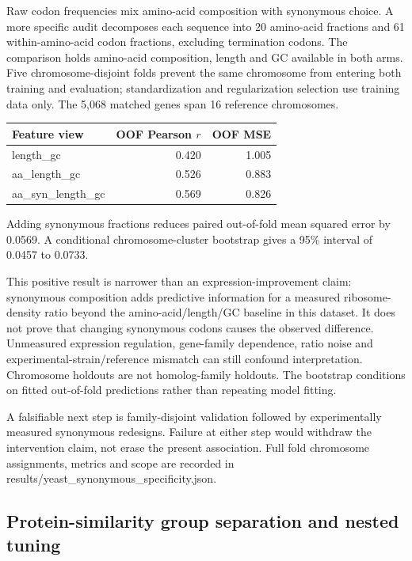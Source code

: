 Raw codon frequencies mix amino-acid composition with synonymous choice. A more specific audit decomposes each sequence into 20 amino-acid fractions and 61 within-amino-acid codon fractions, excluding termination codons. The comparison holds amino-acid composition, length and GC available in both arms. Five chromosome-disjoint folds prevent the same chromosome from entering both training and evaluation; standardization and regularization selection use training data only. The 5,068 matched genes span 16 reference chromosomes.

\begin{center}\begin{tabular}{lrr}\hline Feature view & OOF Pearson $r$ & OOF MSE\\\hline

length\_gc & 0.420 & 1.005 \\

aa\_length\_gc & 0.526 & 0.883 \\

aa\_syn\_length\_gc & 0.569 & 0.826 \\

\hline\end{tabular}\end{center}

Adding synonymous fractions reduces paired out-of-fold mean squared error by 0.0569. A conditional chromosome-cluster bootstrap gives a 95\% interval of 0.0457 to 0.0733.

This positive result is narrower than an expression-improvement claim: synonymous composition adds predictive information for a measured ribosome-density ratio beyond the amino-acid/length/GC baseline in this dataset. It does not prove that changing synonymous codons causes the observed difference. Unmeasured expression regulation, gene-family dependence, ratio noise and experimental-strain/reference mismatch can still confound interpretation. Chromosome holdouts are not homolog-family holdouts. The bootstrap conditions on fitted out-of-fold predictions rather than repeating model fitting.

A falsifiable next step is family-disjoint validation followed by experimentally measured synonymous redesigns. Failure at either step would withdraw the intervention claim, not erase the present association. Full fold chromosome assignments, metrics and scope are recorded in results/yeast\_synonymous\_specificity.json.
\subsection{Protein-similarity group separation and nested tuning}

